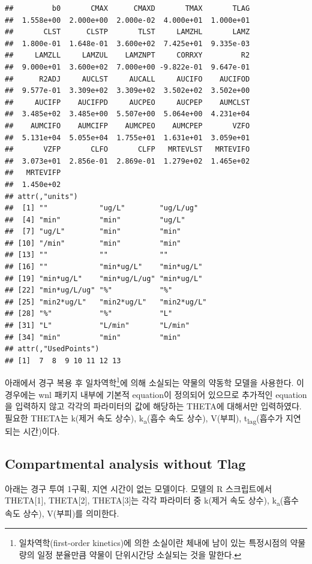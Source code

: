 \documentclass[
  11pt,
  krantz2, a4paper, twoside]{krantz}
\theoremstyle{definition}
\theoremstyle{definition}
\theoremstyle{definition}
\theoremstyle{definition}
\theoremstyle{remark}
\begin{document}
\begin{verbatim}
##         b0       CMAX      CMAXD       TMAX       TLAG 
##  1.558e+00  2.000e+00  2.000e-02  4.000e+01  1.000e+01 
##       CLST      CLSTP       TLST     LAMZHL       LAMZ 
##  1.800e-01  1.648e-01  3.600e+02  7.425e+01  9.335e-03 
##     LAMZLL     LAMZUL    LAMZNPT     CORRXY         R2 
##  9.000e+01  3.600e+02  7.000e+00 -9.822e-01  9.647e-01 
##      R2ADJ     AUCLST     AUCALL     AUCIFO    AUCIFOD 
##  9.577e-01  3.309e+02  3.309e+02  3.502e+02  3.502e+00 
##     AUCIFP    AUCIFPD     AUCPEO     AUCPEP    AUMCLST 
##  3.485e+02  3.485e+00  5.507e+00  5.064e+00  4.231e+04 
##    AUMCIFO    AUMCIFP    AUMCPEO    AUMCPEP       VZFO 
##  5.131e+04  5.055e+04  1.755e+01  1.631e+01  3.059e+01 
##       VZFP       CLFO       CLFP   MRTEVLST   MRTEVIFO 
##  3.073e+01  2.856e-01  2.869e-01  1.279e+02  1.465e+02 
##   MRTEVIFP 
##  1.450e+02 
## attr(,"units")
##  [1] ""            "ug/L"        "ug/L/ug"    
##  [4] "min"         "min"         "ug/L"       
##  [7] "ug/L"        "min"         "min"        
## [10] "/min"        "min"         "min"        
## [13] ""            ""            ""           
## [16] ""            "min*ug/L"    "min*ug/L"   
## [19] "min*ug/L"    "min*ug/L/ug" "min*ug/L"   
## [22] "min*ug/L/ug" "%"           "%"          
## [25] "min2*ug/L"   "min2*ug/L"   "min2*ug/L"  
## [28] "%"           "%"           "L"          
## [31] "L"           "L/min"       "L/min"      
## [34] "min"         "min"         "min"        
## attr(,"UsedPoints")
## [1]  7  8  9 10 11 12 13
\end{verbatim}

아래에서 경구 복용 후 일차역학\footnote{일차역학(first-order kinetics)에 의한 소실이란 체내에 남이 있는 특정시점의 약물량의 일정 분율만큼 약물이 단위시간당 소실되는 것을 말한다.}에 의해 소실되는 약물의 약동학 모델을 사용한다. 
이 경우에는 wnl 패키지 내부에 기본적 equation이 정의되어 있으므로 추가적인 equation을 입력하지 않고 각각의 파라미터의 값에 해당하는 THETA에 대해서만 입력하였다.
필요한 THETA는 k(제거 속도 상수), k\textsubscript{a}(흡수 속도 상수), V(부피), t\textsubscript{lag}(흡수가 지연되는 시간)이다.

\hypertarget{compartmental-analysis-without-tlag}{%
\subsection{Compartmental analysis without Tlag}\label{compartmental-analysis-without-tlag}}

아래는 경구 투여 1구획, 지연 시간이 없는 모델이다. 
모델의 R 스크립트에서 THETA{[}1{]}, THETA{[}2{]}, THETA{[}3{]}는 각각 파라미터 중 k(제거 속도 상수), k\textsubscript{a}(흡수 속도 상수), V(부피)를 의미한다.
\end{document}
